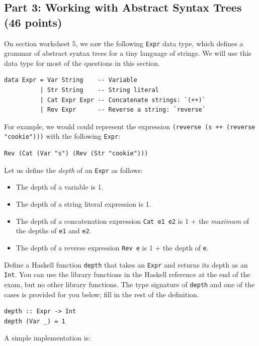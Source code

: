 \documentclass[addpoints]{exam}
\begin{document}
\begin{questions}
\newpage

\subsection*{\textbf{Part 3: Working with Abstract Syntax Trees} (46 points)}

\noindent On section worksheet 5, we saw the following \verb|Expr| data type, which defines a grammar of abstract syntax trees for a tiny language of strings.  We will use this data type for most of the questions in this section.

\begin{verbatim}
data Expr = Var String    -- Variable
          | Str String    -- String literal
          | Cat Expr Expr -- Concatenate strings: `(++)`
          | Rev Expr      -- Reverse a string: `reverse`
\end{verbatim}

For example, we would could represent the expression \verb|(reverse (s ++ (reverse "cookie")))| with the following \verb|Expr|:

\begin{verbatim}
Rev (Cat (Var "s") (Rev (Str "cookie")))
\end{verbatim}

\question[8] Let us define the \emph{depth} of an \verb|Expr| as follows:

\begin{itemize}
\item The depth of a variable is 1.
\item The depth of a string literal expression is 1.
\item The depth of a concatenation expression \verb|Cat e1 e2| is 1 + the \emph{maximum} of the depths of \verb|e1| and \verb|e2|.
\item The depth of a reverse expression \verb|Rev e| is 1 + the depth of \verb|e|.
\end{itemize}

Define a Haskell function \verb|depth| that takes an \verb|Expr| and returns its depth as an \verb|Int|.  You can use the library functions in the Haskell reference at the end of the exam, but no other library functions. The type signature of \verb|depth| and one of the cases is provided for you below; fill in the rest of the definition.

\begin{verbatim}
depth :: Expr -> Int
depth (Var _) = 1
\end{verbatim}
\begin{solutionorbox}[\stretch{1}]
A simple implementation is:
  

\end{solutionorbox}
\end{questions}
\end{document}
